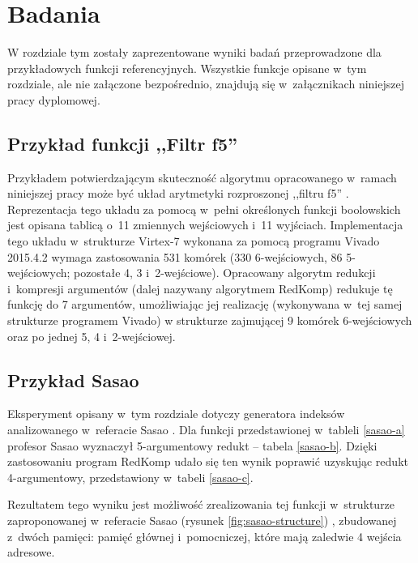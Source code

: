 \chapter{Badania}
\label{chapter:research}

W rozdziale tym zostały zaprezentowane wyniki badań przeprowadzone dla przykładowych funkcji referencyjnych.
Wszystkie funkcje opisane w~tym rozdziale,
ale nie załączone bezpośrednio,
znajdują się w~załącznikach niniejszej pracy dyplomowej.

\section{Przykład funkcji ,,Filtr f5''}

Przykładem potwierdzającym skuteczność algorytmu opracowanego w~ramach niniejszej pracy
może być układ arytmetyki rozproszonej \cite{memory-capacity} ,,filtru f5'' \cite{nine-filters}.
Reprezentacja tego układu za pomocą w~pełni określonych funkcji boolowskich
jest opisana tablicą o~11 zmiennych wejściowych i~11 wyjściach.
Implementacja tego układu \cite{redukcja-kompresja} w~strukturze Virtex-7 wykonana za pomocą programu Vivado 2015.4.2
wymaga zastosowania 531 komórek (330 6-wejściowych, 86 5-wejściowych; pozostałe 4, 3 i~2-wejściowe).
Opracowany algorytm redukcji i~kompresji argumentów (dalej nazywany algorytmem RedKomp)
redukuje tę funkcję do 7 argumentów,
umożliwiając jej realizację
(wykonywana w~tej samej strukturze programem Vivado)
w strukturze zajmującej 9 komórek 6-wejściowych oraz po jednej 5, 4 i~2-wejściowej.

\section{Przykład Sasao}

Eksperyment opisany w~tym rozdziale dotyczy generatora indeksów analizowanego w~referacie Sasao \cite{sasao-workshop}.
Dla funkcji przedstawionej w~tableli \ref{sasao-a} profesor Sasao wyznaczył 5-argumentowy redukt – tabela \ref{sasao-b}.
Dzięki zastosowaniu program RedKomp udało się ten wynik poprawić uzyskując redukt 4-argumentowy,
przedstawiony w~tabeli \ref{sasao-c}.



Rezultatem tego wyniku jest możliwość zrealizowania tej funkcji w~strukturze zaproponowanej w~referacie Sasao (rysunek \ref{fig:sasao-structure}) \cite{sasao-workshop},
zbudowanej z~dwóch pamięci: pamięć głównej i~pomocniczej,
które mają zaledwie 4 wejścia adresowe.

